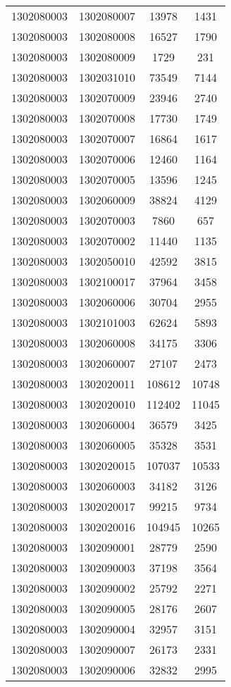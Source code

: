 \begin{longtable}{llcc}
1302080003 & 1302080007 & 13978 & 1431\\
1302080003 & 1302080008 & 16527 & 1790\\
1302080003 & 1302080009 & 1729 & 231\\
1302080003 & 1302031010 & 73549 & 7144\\
1302080003 & 1302070009 & 23946 & 2740\\
1302080003 & 1302070008 & 17730 & 1749\\
1302080003 & 1302070007 & 16864 & 1617\\
1302080003 & 1302070006 & 12460 & 1164\\
1302080003 & 1302070005 & 13596 & 1245\\
1302080003 & 1302060009 & 38824 & 4129\\
1302080003 & 1302070003 & 7860 & 657\\
1302080003 & 1302070002 & 11440 & 1135\\
1302080003 & 1302050010 & 42592 & 3815\\
1302080003 & 1302100017 & 37964 & 3458\\
1302080003 & 1302060006 & 30704 & 2955\\
1302080003 & 1302101003 & 62624 & 5893\\
1302080003 & 1302060008 & 34175 & 3306\\
1302080003 & 1302060007 & 27107 & 2473\\
1302080003 & 1302020011 & 108612 & 10748\\
1302080003 & 1302020010 & 112402 & 11045\\
1302080003 & 1302060004 & 36579 & 3425\\
1302080003 & 1302060005 & 35328 & 3531\\
1302080003 & 1302020015 & 107037 & 10533\\
1302080003 & 1302060003 & 34182 & 3126\\
1302080003 & 1302020017 & 99215 & 9734\\
1302080003 & 1302020016 & 104945 & 10265\\
1302080003 & 1302090001 & 28779 & 2590\\
1302080003 & 1302090003 & 37198 & 3564\\
1302080003 & 1302090002 & 25792 & 2271\\
1302080003 & 1302090005 & 28176 & 2607\\
1302080003 & 1302090004 & 32957 & 3151\\
1302080003 & 1302090007 & 26173 & 2331\\
1302080003 & 1302090006 & 32832 & 2995\\

\end{longtable}
